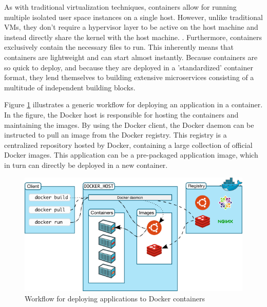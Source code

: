 As with traditional virtualization techniques, containers allow for running multiple isolated user space instances on a single host. However, unlike traditional VMs, they don't require a hypervisor layer to be active on the host machine and instead directly share the kernel with the host machine. \cite{turnbull2014docker}. Furthermore, containers exclusively contain the necessary files to run. This inherently means that containers are lightweight and can start almost instantly. Because containers are so quick to deploy, and because they are deployed in a 'standardized' container format, they lend themselves to building extensive microservices consisting of a multitude of independent building blocks. 

Figure \ref{fig:workflow_docker} illustrates a generic workflow for deploying an application in a container. In the figure, the Docker host is responsible for hosting the containers and maintaining the images. By using the Docker client, the Docker daemon can be instructed to pull an image from the Docker registry. This registry is a centralized repository hosted by Docker, containing a large collection of official Docker images. This application can be a pre-packaged application image, which in turn can directly be deployed in a new container.

\begin{figure}[!ht]
   \centering
   \includegraphics[scale=0.45]{img/architecture.png}
   \caption{Workflow for deploying applications to Docker containers \cite{multihost2015}}
   \label{fig:workflow_docker}
\end{figure}

